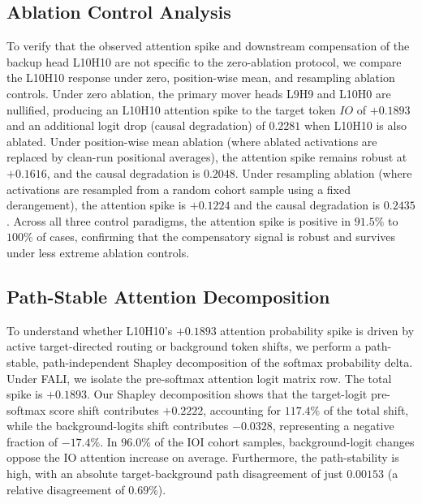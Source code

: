 \documentclass[12pt,a4paper]{article}
\begin{document}
\subsection{Ablation Control Analysis}
To verify that the observed attention spike and downstream compensation of the backup head L10H10 are not specific to the zero-ablation protocol, we compare the L10H10 response under zero, position-wise mean, and resampling ablation controls. Under zero ablation, the primary mover heads L9H9 and L10H0 are nullified, producing an L10H10 attention spike to the target token $IO$ of $+0.1893$ and an additional logit drop (causal degradation) of $0.2281$ when L10H10 is also ablated. Under position-wise mean ablation (where ablated activations are replaced by clean-run positional averages), the attention spike remains robust at $+0.1616$, and the causal degradation is $0.2048$. Under resampling ablation (where activations are resampled from a random cohort sample using a fixed derangement), the attention spike is $+0.1224$ and the causal degradation is $0.2435$. Across all three control paradigms, the attention spike is positive in $91.5\%$ to $100\%$ of cases, confirming that the compensatory signal is robust and survives under less extreme ablation controls.

\subsection{Path-Stable Attention Decomposition}
To understand whether L10H10's $+0.1893$ attention probability spike is driven by active target-directed routing or background token shifts, we perform a path-stable, path-independent Shapley decomposition of the softmax probability delta. Under FALI, we isolate the pre-softmax attention logit matrix row. The total spike is $+0.1893$. Our Shapley decomposition shows that the target-logit pre-softmax score shift contributes $+0.2222$, accounting for $117.4\%$ of the total shift, while the background-logits shift contributes $-0.0328$, representing a negative fraction of $-17.4\%$. In $96.0\%$ of the IOI cohort samples, background-logit changes oppose the IO attention increase on average. Furthermore, the path-stability is high, with an absolute target-background path disagreement of just $0.00153$ (a relative disagreement of $0.69\%$).
\end{document}
